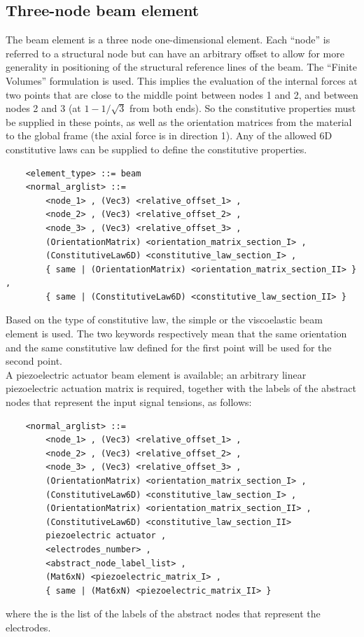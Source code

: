 \subsection{Three-node beam element}
The beam element is a three node one-dimensional element.
Each ``node'' is referred to a structural node but can have an arbitrary
offset to allow for more generality in positioning of the structural 
reference lines of the beam.
The ``Finite Volumes'' formulation is used. 
This implies the evaluation of the internal forces at two points 
that are close to the middle point between nodes 1 and 2, 
and between nodes 2 and 3 (at $ 1-1/\sqrt{3} $ from both ends).
So the constitutive properties must be supplied in these points, as well as
the orientation matrices from the material to the global frame (the axial force
is in direction 1).
Any of the allowed 6D constitutive laws can be supplied to define the
constitutive properties.
\begin{verbatim}
    <element_type> ::= beam
    <normal_arglist> ::=
        <node_1> , (Vec3) <relative_offset_1> ,
        <node_2> , (Vec3) <relative_offset_2> ,
        <node_3> , (Vec3) <relative_offset_3> ,
        (OrientationMatrix) <orientation_matrix_section_I> ,
        (ConstitutiveLaw6D) <constitutive_law_section_I> ,
        { same | (OrientationMatrix) <orientation_matrix_section_II> } ,
        { same | (ConstitutiveLaw6D) <constitutive_law_section_II> }
\end{verbatim}
Based on the type of constitutive law, the simple or the viscoelastic beam
element is used.
The two keywords  respectively mean that the same orientation 
and the same constitutive law defined for the first point will be used 
for the second point. \\
A piezoelectric actuator beam element is available; an arbitrary
linear piezoelectric actuation matrix is required, together with the labels
of the abstract nodes that represent the input signal tensions, as follows:
\begin{verbatim}
    <normal_arglist> ::=
        <node_1> , (Vec3) <relative_offset_1> ,
        <node_2> , (Vec3) <relative_offset_2> ,
        <node_3> , (Vec3) <relative_offset_3> ,
        (OrientationMatrix) <orientation_matrix_section_I> ,
        (ConstitutiveLaw6D) <constitutive_law_section_I> ,
        (OrientationMatrix) <orientation_matrix_section_II> ,
        (ConstitutiveLaw6D) <constitutive_law_section_II>
        piezoelectric actuator , 
        <electrodes_number> ,
        <abstract_node_label_list> ,
        (Mat6xN) <piezoelectric_matrix_I> ,
        { same | (Mat6xN) <piezoelectric_matrix_II> }
\end{verbatim}
where the  is the list of the labels of the
abstract nodes that represent the electrodes.

